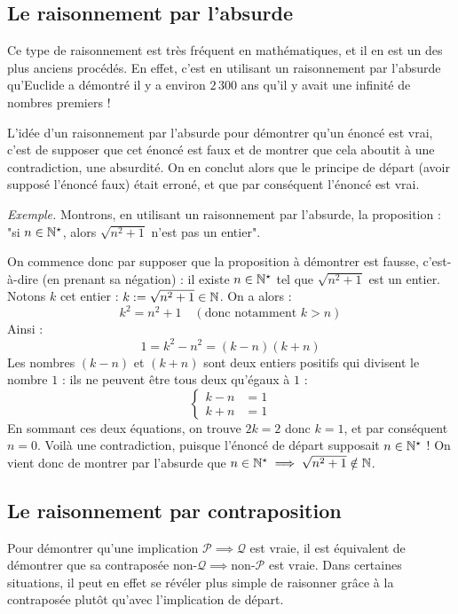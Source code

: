 \documentclass[11pt,class=report,crop=false]{standalone}
\begin{document}
\subsection*{Le raisonnement par l'absurde}

Ce type de raisonnement est très fréquent en mathématiques, et il en est un des plus anciens procédés. En effet, c'est en utilisant un raisonnement par l'absurde qu'Euclide a démontré il y a environ $2 \, 300$ ans qu'il y avait une infinité de nombres premiers !

L'idée d'un raisonnement par l'absurde pour démontrer qu'un énoncé est vrai, c'est de supposer que cet énoncé est faux et de montrer que cela aboutit à une contradiction, une absurdité. On en conclut alors que le principe de départ (avoir supposé l'énoncé faux) était erroné, et que par conséquent l'énoncé est vrai.



\bigskip

\emph{Exemple.}
Montrons, en utilisant un raisonnement par l'absurde, la proposition : "si $n \in \mathbb{N}^\star$, alors $\sqrt{n^2+1}$ n'est pas un entier".


On commence donc par supposer que la proposition à démontrer est fausse, c'est-à-dire (en prenant sa négation) :  il existe $n \in \mathbb{N}^\star$ tel que $\sqrt{n^2+1}$ est un entier. Notons $k$ cet entier : $k := \sqrt{n^2+1} \in \mathbb{N}$. 
On a alors :
$$k^2 = n^2+1  \quad (\text{donc notamment }k>n)$$
Ainsi :
$$1 = k^2-n^2=(k-n)(k+n)$$
Les nombres $(k-n)$ et $(k+n)$ sont deux entiers positifs qui divisent le nombre $1$ : ils ne peuvent être tous deux qu'égaux à $1$ :
  $$\begin{cases}
    k-n  &=1 \\
    k+n &=1
  \end{cases}$$
En sommant ces deux équations, on trouve $2k=2$ donc $k=1$, et par conséquent $n=0$. Voilà une contradiction, puisque l'énoncé de départ supposait $n \in \mathbb{N}^\star$ !
On vient donc de montrer par l'absurde que $n \in \mathbb{N}^\star \implies \sqrt{n^2+1} \notin \mathbb{N}$.
    
    
\subsection*{Le raisonnement par contraposition}

Pour démontrer qu'une implication $\mathcal{P} \implies \mathcal{Q}$ est vraie, il est équivalent de démontrer que sa contraposée non-$\mathcal{Q} \implies $non-$\mathcal{P}$ est vraie. Dans certaines situations, il peut en effet se révéler plus simple de raisonner grâce à la contraposée plutôt qu'avec l'implication de départ.
\end{document}
